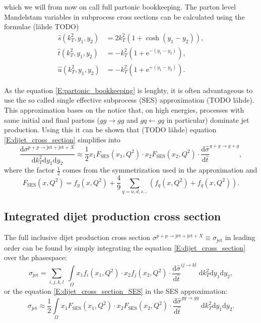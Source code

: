 \documentclass[a4paper, twoside, english, 12pt]{article}
\begin{document}
which we will from now on call full partonic bookkeeping. The parton level Mandelstam variables in subprocess cross sections can be calculated using the formulae (lähde TODO)
\begin{align}
\hat{s}(k_T^2,y_1,y_2) &= 2k_T^2(1+\cosh(y_1-y_2)), \label{E:Mandelstam_s}\\
\hat{t}(k_T^2,y_1,y_2) &= -k_T^2(1+\text{e}^{-(y_1-y_2)}),\label{E:Mandelstam_t}\\
\hat{u}(k_T^2,y_1,y_2) &=  -k_T^2(1+\text{e}^{+(y_1-y_2)}). \label{E:Mandelstam_u}
\end{align}

As the equation \eqref{E:partonic_bookkeeping} is lenghty, it is often advantageous to use the so called single effective subprocess (SES) approximation (TODO lähde). This approximation bases on the notice that, on high energies, processes with same initial and final partons ($gg\rightarrow gg$ and $gq\leftarrow gq$ in particular) dominate jet production. Using this it can be shown that (TODO lähde) equation \eqref{E:dijet_cross_section} simplifies into
\begin{equation}\label{E:dijet_cross_section_SES}
\frac{\text{d}\sigma^{p+p\rightarrow\text{jet}+\text{jet}+X}}{\text{d}k_T^2\text{d}y_1\text{d}y_2} \approx \frac{1}{2}x_1F_{\text{SES}}(x_1,Q^2)\cdot x_2F_{\text{SES}}(x_2,Q^2) \cdot\frac{\text{d}\hat{\sigma}}{\text{d}\hat{t}}^{g+g\rightarrow g+g},
\end{equation}
where the factor $\frac{1}{2}$ comes from the symmetrization used in the approximation and
\begin{equation}\label{E:F_SES}
	F_{\text{SES}}(x,Q^2) = f_g(x,Q^2) + \frac{4}{9} \sum\limits_{q=u,d,s\ldots }\left(f_q(x,Q^2)+f_{\bar{q}}(x,Q^2)\right).
\end{equation}

\subsection{Integrated dijet production cross section}

The full inclusive dijet production cross section $\sigma^{p+p\rightarrow\text{jet}+\text{jet}+X} \equiv \sigma_{\text{jet}}$ in leading order can be found by simply integrating the equation \eqref{E:dijet_cross_section} over the phasespace:
\begin{equation}\label{E:integrated_sigma_jet}
	\sigma_{\text{jet}} = \sum_{i,j,k,l}\;\int\limits_{\Omega} x_1f_i(x_1,Q^2)\cdot x_2f_j(x_2,Q^2) \cdot\frac{\text{d}\hat{\sigma}}{\text{d}\hat{t}}^{ij\rightarrow kl}\;\text{d}k_T^2\text{d}y_1\text{d}y_2 , 
\end{equation}
or the equation \eqref{E:dijet_cross_section_SES} in the SES approximation:
\begin{equation}\label{E:integrated_sigma_jet_SES}
\sigma_{\text{jet}} \approx \frac{1}{2}\int\limits_{\Omega} x_1F_{\text{SES}}(x_1,Q^2)\cdot x_2F_{\text{SES}}(x_2,Q^2) \cdot\frac{\text{d}\hat{\sigma}}{\text{d}\hat{t}}^{gg\rightarrow gg}\;\text{d}k_T^2\text{d}y_1\text{d}y_2 .
\end{equation}
\end{document}

